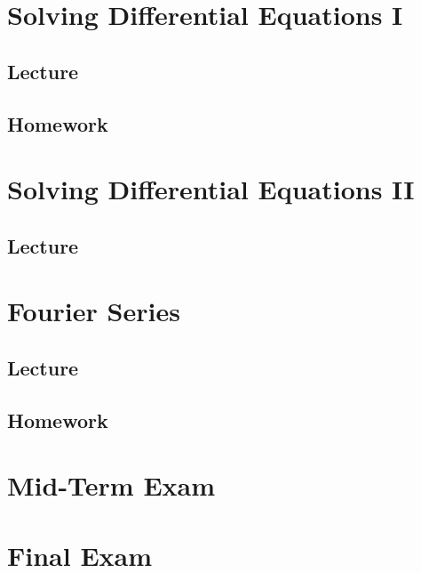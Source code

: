 \documentclass[openany]{book}
\begin{document}
\chapter{Solving Differential Equations I}
\section{Lecture}

\section{Homework}






\chapter{Solving Differential Equations II}
\section{Lecture}




\chapter{Fourier Series}
\section{Lecture}

\section{Homework}



\appendix
\chapter{Mid-Term Exam}



\chapter{Final Exam}

\end{document}

